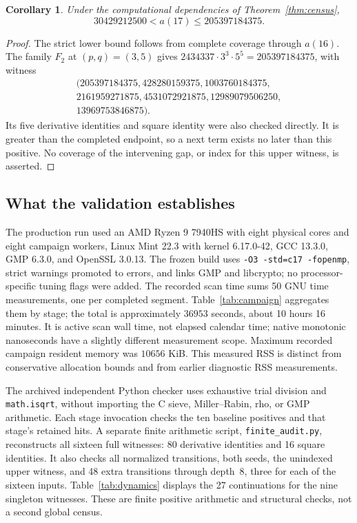 \documentclass[11pt,a4paper]{article}
\newtheorem{corollary}[theorem]{Corollary}
\theoremstyle{definition}
\theoremstyle{remark}
\begin{document}
\begin{corollary}\label{cor:next}
Under the computational dependencies of Theorem~\ref{thm:census},
\begin{equation}\label{eq:next}
 30429212500<a(17)\le205397184375.
\end{equation}
\end{corollary}
\begin{proof}
The strict lower bound follows from complete coverage through $a(16)$.
The family $F_2$ at $(p,q)=(3,5)$ gives
$2434337\cdot3^3\cdot5^5=205397184375$, with witness
\[
 \begin{gathered}
 (205397184375,428280159375,1003760184375,\\
 2161959271875,4531072921875,12989079506250,\\
 13969753846875).
 \end{gathered}
\]
Its five derivative identities and square identity were also checked
directly. It is greater than the completed endpoint, so a next term exists
no later than this positive. No coverage of the intervening gap, or index
for this upper witness, is asserted.
\end{proof}

\subsection{What the validation establishes}\label{sec:validation}
The production run used an AMD Ryzen 9 7940HS with eight physical cores
and eight campaign workers, Linux Mint 22.3 with kernel 6.17.0-42,
GCC 13.3.0, GMP 6.3.0, and OpenSSL 3.0.13. The frozen build uses
\texttt{-O3 -std=c17 -fopenmp}, strict warnings promoted to errors, and
links GMP and libcrypto; no processor-specific tuning flags were added.
The recorded scan time sums 50 GNU time measurements, one per completed
segment. Table~\ref{tab:campaign} aggregates them by stage; the total is
approximately $36953$ seconds, about 10 hours 16 minutes. It is active scan wall time,
not elapsed calendar time; native monotonic nanoseconds have a slightly
different measurement scope. Maximum recorded campaign resident memory
was $10656$ KiB. This measured RSS is distinct from conservative
allocation bounds and from earlier diagnostic RSS measurements.

The archived independent Python checker uses exhaustive trial division and
\texttt{math.isqrt}, without importing the C sieve, Miller--Rabin,
rho, or GMP arithmetic. Each stage invocation checks the ten baseline
positives and that stage's retained hits. A separate finite arithmetic
script, \texttt{finite\_audit.py}, reconstructs all sixteen full witnesses:
80 derivative identities and 16 square identities. It also checks all
normalized transitions, both seeds, the unindexed upper witness, and
48 extra transitions through depth~8, three for each of the sixteen inputs.
Table~\ref{tab:dynamics} displays the 27 continuations for the nine
singleton witnesses. These are finite positive arithmetic and structural
checks, not a second global census.
\end{document}
